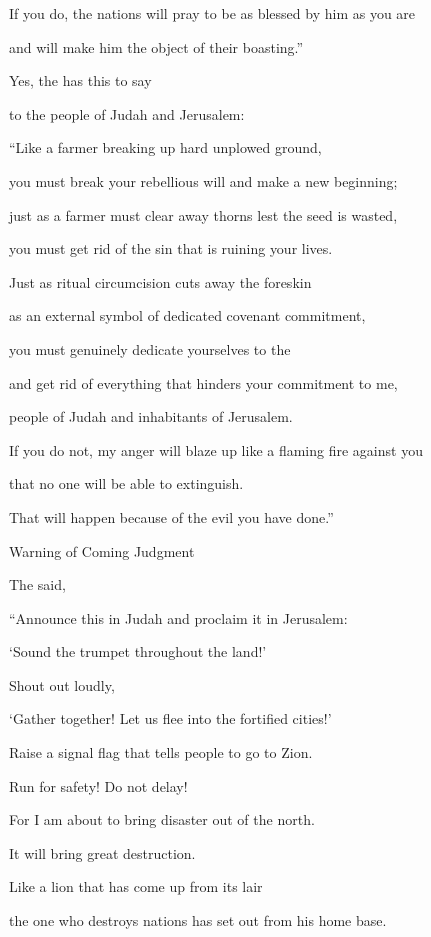 {\par }{\Q If you do, the nations
will pray to be as blessed
by him as you are
\par }{\Q and will make him the object of their boasting.”
\par }{\Q {}Yes,
the {}
has this
to say
\par }{\Q to the people
of Judah
and Jerusalem:
\par }{\Q “Like a farmer breaking up
hard unplowed ground,
\par }{\Q you must break your rebellious will and make a new beginning;
\par }{\Q just as a farmer must clear away thorns
lest the seed
is wasted,
\par }{\Q you must get rid of the sin that is ruining your lives.
\par }{\Q {}Just as ritual circumcision
cuts away
the foreskin
\par }{\Q as an external symbol
of dedicated covenant commitment,
\par }{\Q you must genuinely dedicate yourselves to the
{}
\par }{\Q and get rid of everything
that hinders
your commitment to me,

\par }{\Q people of Judah
and inhabitants
of Jerusalem.
\par }{\Q If you do not,
my anger
will blaze up
like a flaming
fire
against you
\par }{\Q that no one
will be able to extinguish.
\par }{\Q That will happen because of the evil
you have done.”
\par }{\SH Warning of Coming Judgment
\par }{\PP {}The
{} said,
\par }{\Q “Announce
this in Judah
and proclaim
it in Jerusalem:

\par }{\Q ‘Sound
the trumpet
throughout the land!’
\par }{\Q Shout out
loudly,
\par }{\Q ‘Gather together! Let us flee
into
the fortified
cities!’
\par }{\Q {}Raise
a signal flag
that tells people to go to Zion.
\par }{\Q Run for safety! Do not
delay!
\par }{\Q For
I
am about to bring
disaster
out of the north.
\par }{\Q It will bring great
destruction.
\par }{\Q {}Like a lion
that has come up
from its lair
\par }{\Q the one who destroys
nations
has set
out
from his home
base.

}
